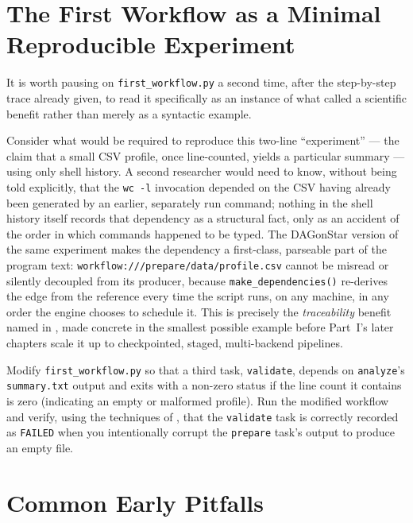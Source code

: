 \section{The First Workflow as a Minimal Reproducible Experiment}

It is worth pausing on \texttt{first\_workflow.py} a second time, after the
step-by-step trace already given, to read it specifically as an instance of
what  called a scientific benefit rather than merely
as a syntactic example.

Consider what would be required to reproduce this two-line ``experiment''
--- the claim that a small CSV profile, once line-counted, yields a
particular summary --- using only shell history. A second researcher would
need to know, without being told explicitly, that the \texttt{wc -l}
invocation depended on the CSV having already been generated by an earlier,
separately run command; nothing in the shell history itself records that
dependency as a structural fact, only as an accident of the order in which
commands happened to be typed. The DAGonStar version of the same experiment
makes the dependency a first-class, parseable part of the program text:
\texttt{workflow:///prepare/data/profile.csv} cannot be misread or silently
decoupled from its producer, because \texttt{make\_dependencies()} re-derives
the edge from the reference every time the script runs, on any machine, in
any order the engine chooses to schedule it. This is precisely the
\emph{traceability} benefit named in , made concrete
in the smallest possible example before Part~I's later chapters scale it up
to checkpointed, staged, multi-backend pipelines.

\begin{exercise}
Modify \texttt{first\_workflow.py} so that a third task,
\texttt{validate}, depends on \texttt{analyze}'s \texttt{summary.txt} output
and exits with a non-zero status if the line count it contains is zero
(indicating an empty or malformed profile). Run the modified workflow and
verify, using the techniques of , that the
\texttt{validate} task is correctly recorded as \texttt{FAILED} when you
intentionally corrupt the \texttt{prepare} task's output to produce an empty
file.
\end{exercise}

\section{Common Early Pitfalls}

